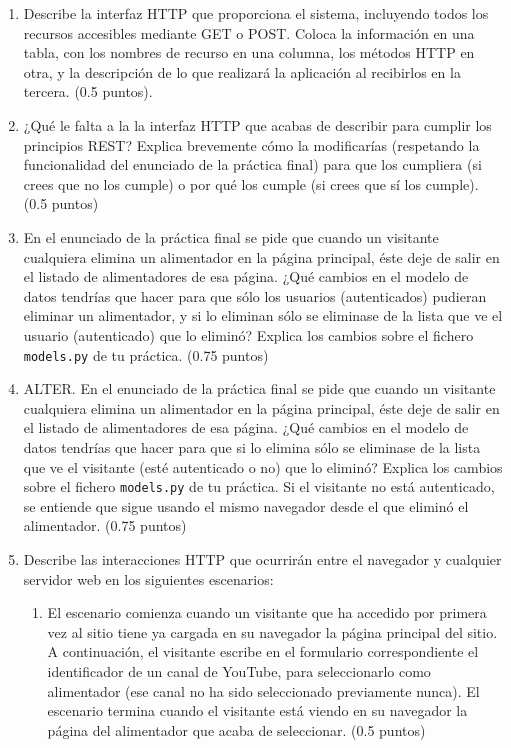 \begin{enumerate}
\item Describe la interfaz HTTP que proporciona el sistema, incluyendo todos los recursos accesibles mediante GET o POST. Coloca la información en una tabla, con los nombres de recurso en una columna, los métodos HTTP en otra, y la descripción de lo que realizará la aplicación al recibirlos en la tercera. (0.5 puntos).

\item ¿Qué le falta a la la interfaz HTTP que acabas de describir para cumplir los principios REST? Explica brevemente cómo la modificarías (respetando la funcionalidad del enunciado de la práctica final) para que los cumpliera (si crees que no los cumple) o por qué los cumple (si crees que sí los cumple). (0.5 puntos) 
\item En el enunciado de la práctica final se pide que cuando un visitante cualquiera elimina un alimentador en la página principal, éste deje de salir en el listado de alimentadores de esa página. ¿Qué cambios en el modelo de datos tendrías que hacer para que sólo los usuarios (autenticados) pudieran eliminar un alimentador, y si lo eliminan sólo se eliminase de la lista que ve el usuario (autenticado) que lo eliminó? Explica los cambios sobre el fichero \verb|models.py| de tu práctica. (0.75 puntos)

\item ALTER. En el enunciado de la práctica final se pide que cuando un visitante cualquiera elimina un alimentador en la página principal, éste deje de salir en el listado de alimentadores de esa página. ¿Qué cambios en el modelo de datos tendrías que hacer para que si lo elimina sólo se eliminase de la lista que ve el visitante (esté autenticado o no) que lo eliminó? Explica los cambios sobre el fichero \verb|models.py| de tu práctica. Si el visitante no está autenticado, se entiende que sigue usando el mismo navegador desde el que eliminó el alimentador. (0.75 puntos)

\item Describe las interacciones HTTP que ocurrirán entre el navegador y cualquier servidor web en los siguientes escenarios:

  \begin{enumerate}
  \item El escenario comienza cuando un visitante que ha accedido por primera vez al sitio tiene ya cargada en su navegador la página principal del sitio. A continuación, el visitante escribe en el formulario correspondiente el identificador de un canal de YouTube, para seleccionarlo como alimentador (ese canal no ha sido seleccionado previamente nunca). El escenario termina cuando el visitante está viendo en su navegador la página del alimentador que acaba de seleccionar. (0.5 puntos)


\end{enumerate}
\end{enumerate}
